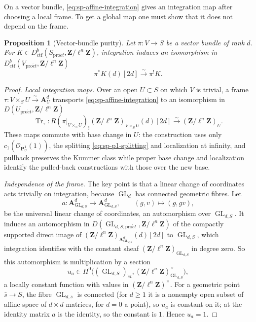 \documentclass[11pt,a4paper]{article}
\numberwithin{equation}{section}
\newtheorem{proposition}[theorem]{Proposition}
\theoremstyle{definition}
\theoremstyle{remark}
\newcommand{\et}{\acute{e}t}
\newcommand{\proet}{\mathrm{pro}\acute{e}t}
\newcommand{\Dctf}{D^b_{\mathrm{ctf}}}
\DeclareMathOperator{\GL}{GL}
\begin{document}
On a vector bundle, \eqref{eq:sp-affine-integration} gives an
integration map after choosing a local frame. To get a global map one
must show that it does not depend on the frame.

\begin{proposition}[Vector-bundle purity]\label{prop:sp-vector}
Let $\pi:V\to S$ be a vector bundle of rank $d$.
For $K\in\Dctf(S_{\proet},\mathbf Z/\ell^n\mathbf Z)$, integration induces an
isomorphism in $\Dctf(V_{\proet},\mathbf Z/\ell^n\mathbf Z)$
\[
 \pi^{*}K(d)[2d]\xrightarrow{\sim}\pi^{!}K.
\]
\end{proposition}
\begin{proof}
\emph{Local integration maps.} Over an open $U\subset S$ on which $V$
is trivial, a frame $\tau:V\times_S U\xrightarrow{\sim}\mathbf A^d_U$
transports \eqref{eq:sp-affine-integration} to an isomorphism in
$D(U_{\proet},\mathbf Z/\ell^n\mathbf Z)$
\[
 \operatorname{Tr}_{\tau}:
 R(\pi|_{V\times_S U})_!(\mathbf Z/\ell^n\mathbf Z)_{V\times_S U}(d)[2d]
       \xrightarrow{\sim}(\mathbf Z/\ell^n\mathbf Z)_U.
\]
These maps commute with base change in $U$: the construction uses
only $c_1(\mathcal O_{\mathbf P^1_U}(1))$, the splitting
\eqref{eq:sp-p1-splitting} and localization at infinity, and pullback
preserves the Kummer class while proper base change and localization
identify the pulled-back constructions with those over the new base.

\emph{Independence of the frame.} The key point is that a linear change
of coordinates acts trivially on integration, because $\GL_d$ has
connected geometric fibres. Let
\[
 a:\mathbf A^d_{\GL_{d,S}}\longrightarrow\mathbf A^d_{\GL_{d,S}},
       \qquad (g,v)\longmapsto(g,gv),
\]
be the universal linear change of coordinates, an automorphism over
$\GL_{d,S}$. It induces an automorphism in
$D(\GL_{d,S,\proet},\mathbf Z/\ell^n\mathbf Z)$ of the compactly supported
direct image of $(\mathbf Z/\ell^n\mathbf Z)_{\mathbf A^d_{\GL_{d,S}}}(d)[2d]$
to $\GL_{d,S}$, which integration identifies with the constant sheaf
$(\mathbf Z/\ell^n\mathbf Z)_{\GL_{d,S}}$ in degree zero. So this
automorphism is multiplication by a section
\[
 u_a\in H^0\bigl((\GL_{d,S})_{\et},
                    (\mathbf Z/\ell^n\mathbf Z)_{\GL_{d,S}}^{\times}\bigr),
\]
a locally constant function with values in
$(\mathbf Z/\ell^n\mathbf Z)^{\times}$. For a geometric point
$\bar s\to S$, the fibre $\GL_{d,\bar s}$ is connected (for $d\geq1$ it
is a nonempty open subset of affine space of $d\times d$ matrices, for
$d=0$ a point), so $u_a$ is constant on it; at the identity matrix $a$
is the identity, so the constant is $1$. Hence $u_a=1$.


\end{proof}
\end{document}
